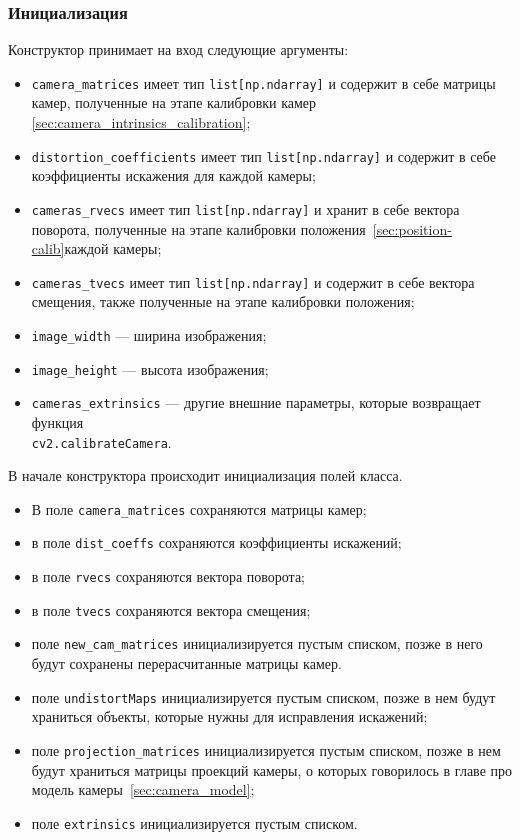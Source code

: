 \documentclass[14pt, a4paper]{extarticle}
\begin{document}
\subsubsection{Инициализация}
Конструктор принимает на вход следующие аргументы:
\begin{itemize}
  \item \texttt{camera\_matrices} имеет тип \texttt{list[np.ndarray]} и
    содержит в себе матрицы камер, полученные на этапе калибровки камер
    \ref{sec:camera_intrinsics_calibration};
  \item \texttt{distortion\_coefficients} имеет тип \texttt{list[np.ndarray]} и содержит
    в себе коэффициенты искажения для каждой камеры;
  \item \texttt{cameras\_rvecs} имеет тип \texttt{list[np.ndarray]} и хранит в
    себе вектора поворота, полученные на этапе калибровки
    положения~\ref{sec:position-calib}каждой камеры;
  \item \texttt{cameras\_tvecs} имеет тип \texttt{list[np.ndarray]} и содержит
    в себе вектора смещения, также полученные на этапе калибровки положения;
  \item \texttt{image\_width} --- ширина изображения;
  \item \texttt{image\_height} --- высота изображения;
  \item \texttt{cameras\_extrinsics} --- другие внешние параметры, которые
    возвращает функция \\\texttt{cv2.calibrateCamera}.
\end{itemize}

В начале конструктора происходит инициализация полей класса.
\begin{itemize}
  \item В поле \texttt{camera\_matrices} сохраняются матрицы камер;
  \item в поле \texttt{dist\_coeffs} сохраняются коэффициенты искажений;
  \item в поле \texttt{rvecs} сохраняются вектора поворота;
  \item в поле \texttt{tvecs} сохраняются вектора смещения; 
  \item поле \texttt{new\_cam\_matrices} инициализируется пустым списком, позже в
    него будут сохранены перерасчитанные матрицы камер.
  \item поле \texttt{undistortMaps} инициализируется пустым списком, позже в
    нем будут храниться объекты, которые нужны для исправления искажений;
  \item поле \texttt{projection\_matrices} инициализируется пустым списком,
    позже в нем будут храниться матрицы проекций камеры, о которых говорилось в
    главе про модель камеры~\ref{sec:camera_model};
  \item поле \texttt{extrinsics} инициализируется пустым списком.
\end{itemize}
\end{document}
